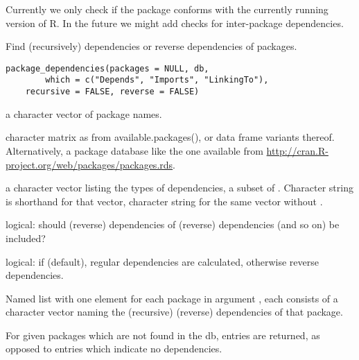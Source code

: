 %
\begin{Details}\relax
Currently we only check if the package conforms with the currently
running version of R.  In the future we might add checks for 
inter-package dependencies.
\end{Details}
%
\begin{SeeAlso}\relax
{}
\end{SeeAlso}
%
\begin{Description}\relax
Find (recursively) dependencies or reverse dependencies of packages.
\end{Description}
%
\begin{Usage}
\begin{verbatim}
package_dependencies(packages = NULL, db, 
        which = c("Depends", "Imports", "LinkingTo"), 
	recursive = FALSE, reverse = FALSE)
\end{verbatim}
\end{Usage}
%
\begin{Arguments}
\begin{ldescription}
\item[\code{packages}] a character vector of package names.
\item[\code{db}] character matrix as from available.packages(), or data frame variants thereof.
Alternatively, a package database like the one available from
\url{http://cran.R-project.org/web/packages/packages.rds}.

\item[\code{which}] a character vector listing the types of
dependencies, a subset of .  Character string  is
shorthand for that vector, character string  
for the same vector without .

\item[\code{recursive}] logical: should (reverse) dependencies of (reverse)
dependencies (and so on) be included?

\item[\code{reverse}] logical: if  (default), regular dependencies are calculated,
otherwise reverse dependencies.

\end{ldescription}
\end{Arguments}
%
\begin{Value}
Named list with one element for each package in argument ,
each consists of a character vector naming the (recursive) (reverse) dependencies
of that package.

For given packages which are not found in the db,  entries are returned, 
as opposed to  entries which indicate no dependencies.
\end{Value}
